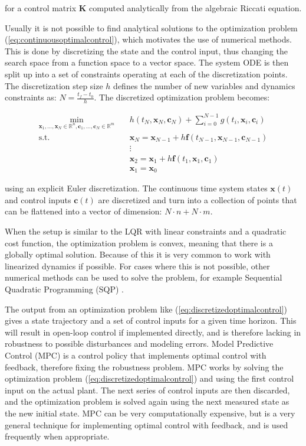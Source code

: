 \noindent for a control matrix $\bm{K}$ computed analytically from the algebraic Riccati equation.

Usually it is not possible to find analytical solutions to the optimization problem (\ref{eq:continuousoptimalcontrol}), which motivates the use of numerical methods. This is done by discretizing the state and the control input, thus changing the search space from a function space to a vector space. The system ODE is then split up into a set of constraints operating at each of the discretization points. The discretization step size $h$ defines the number of new variables and dynamics constraints as: $N = \frac{t_f - t_0}{h}$. The discretized optimization problem becomes:

\begin{equation}
    \begin{aligned}
        \min_{\bm{x}_1, \dots, \bm{x}_N \in \mathbb{R}^{n}, \bm{c}_1, \dots, \bm{c}_N \in \mathbb{R}^{m}} \quad & h(t_N, \bm{x}_N, \bm{c}_N) + \sum_{i=0}^{N-1} g(t_i, \bm{x}_i, \bm{c}_i) \\
        \textrm{s.t.} \quad & \bm{x}_N = \bm{x}_{N - 1} + h \bm{f}(t_{N - 1}, \bm{x}_{N - 1}, \bm{c}_{N - 1}) \\
        & \vdots \\
        & \bm{x}_2 = \bm{x}_1 + h \bm{f}(t_1, \bm{x}_1, \bm{c}_1) \\
        & \bm{x}_1 = \bm{x}_0
    \end{aligned}
    \label{eq:discretizedoptimalcontrol}
\end{equation}

\noindent using an explicit Euler discretization. The continuous time system states $\bm{x}(t)$ and control inputs $\bm{c}(t)$ are discretized and turn into a collection of points that can be flattened into a vector of dimension: $N \cdot n + N \cdot m$.

When the setup is similar to the LQR with linear constraints and a quadratic cost function, the optimization problem is convex, meaning that there is a globally optimal solution. Because of this it is very common to work with linearized dynamics if possible. For cases where this is not possible, other numerical methods can be used to solve the problem, for example Sequential Quadratic Programming (SQP) \cite{numericaloptimization}.

The output from an optimization problem like (\ref{eq:discretizedoptimalcontrol}) gives a state trajectory and a set of control inputs for a given time horizon. This will result in open-loop control if implemented directly, and is therefore lacking in robustness to possible disturbances and modeling errors. Model Predictive Control (MPC) is a control policy that implements optimal control with feedback, therefore fixing the robustness problem. MPC works by solving the optimization problem (\ref{eq:discretizedoptimalcontrol}) and using the first control input on the actual plant. The next series of control inputs are then discarded, and the optimization problem is solved again using the next measured state as the new initial state. MPC can be very computationally expensive, but is a very general technique for implementing optimal control with feedback, and is used frequently when appropriate.

